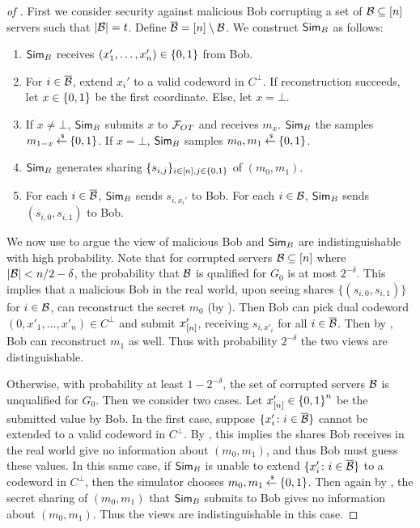 \begin{proof}[of ]
	First we consider security against malicious Bob corrupting a set of ${\mathcal B} \subseteq[n]$ servers such that $|{\mathcal B}| = t$.
	Define $\overline{{\mathcal B}} = [n]\setminus{\mathcal B}$.
	We construct $\mathsf{Sim}_B$ as follows:
	\begin{enumerate}
		\item $\mathsf{Sim}_B$ receives $(x_1',\dotsc, x_n') \in {\{0,1\}}$ from Bob.
		\item For $i \in \overline{{\mathcal B}}$, extend $x_i'$ to a valid codeword in $C^\perp$.
		If reconstruction succeeds, let $x \in {\{0,1\}}$ be the first coordinate.
		Else, let $x = \bot$.
		\item If $x \neq \bot$, $\mathsf{Sim}_B$ submits $x$ to ${\mathcal F}_{OT}$ and receives $m_x$.
		$\mathsf{Sim}_B$ the samples $m_{1-x} \mathbin{\stackrel{\mbox{\,\tiny \$}}{\gets}} {\{0,1\}}$.
		If $x = \bot$, $\mathsf{Sim}_B$ samples $m_0,m_1 \mathbin{\stackrel{\mbox{\,\tiny \$}}{\gets}} {\{0,1\}}$.
		\item $\mathsf{Sim}_B$ generates sharing $\{ s_{i,j} \}_{i \in [n], j \in {\{0,1\}}}$ of $(m_0, m_1)$.
		\item For each $i \in \overline{{\mathcal B}}$, $\mathsf{Sim}_B$ sends $s_{i, x_i'}$ to Bob.
		For each $i \in {\mathcal B}$, $\mathsf{Sim}_B$ sends $(s_{i,0}, s_{i,1})$ to Bob.
	\end{enumerate}
	We now use  to argue the view of malicious Bob and $\mathsf{Sim}_B$ are indistinguishable with high probability.
	Note that for corrupted servers ${\mathcal B} \subseteq [n]$ where $|{\mathcal B}| < n/2 - \delta$, the probability that ${\mathcal B}$ is qualified for $G_0$ is at most $2^{-\delta}$.
	This implies that a malicious Bob in the real world, upon seeing shares $\{ (s_{i,0}, s_{i,1}) \}$ for $i \in {\mathcal B}$, can reconstruct the secret $m_0$ (by ).
	Then Bob can pick dual codeword $(0, x'_1,\dotsc,x'_n) \in C^\perp$ and submit $x'_{[n]}$, receiving $s_{i, x'_i}$ for all $i \in \overline{{\mathcal B}}$.
	Then by , Bob can reconstruct $m_1$ as well.
	Thus with probability $2^{-\delta}$ the two views are distinguishable.
	
	Otherwise, with probability at least $1 - 2^{-\delta}$, the set of corrupted servers ${\mathcal B}$ is unqualified for $G_0$.
	Then we consider two cases.
	Let $x'_{[n]} \in {\{0,1\}}^n$ be the submitted value by Bob.
	In the first case, suppose $\{ x_i' \colon i \in \overline{{\mathcal B}} \}$ cannot be extended to a valid codeword in $C^\perp$.
	By , this implies the shares Bob receives in the real world give no information about $(m_0,m_1)$, and thus Bob must guess these values.
	In this same case, if $\mathsf{Sim}_B$ is unable to extend $\{ x_i' \colon i \in \overline{{\mathcal B}} \}$ to a codeword in $C^\perp$, then the simulator chooses $m_0, m_1 \mathbin{\stackrel{\mbox{\,\tiny \$}}{\gets}} {\{0,1\}}$.
	Then again by , the secret sharing of $(m_0, m_1)$ that $\mathsf{Sim}_B$ submits to Bob gives no information about $(m_0,m_1)$.
	Thus the views are indistinguishable in this case.
	

\end{proof}
